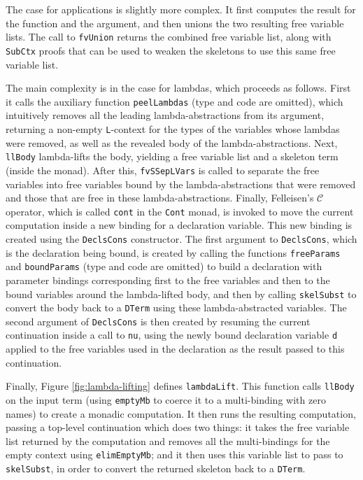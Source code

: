 \documentclass[natbib]{sigplanconf}
\begin{document}
The case for applications is slightly more complex. It first computes
the result for the function and the argument, and then unions the two
resulting free variable lists. The call to \lstinline{fvUnion} returns
the combined free variable list, along with \lstinline{SubCtx} proofs
that can be used to weaken the skeletons to use this same free
variable list.


The main complexity is in the case for lambdas, which proceeds as
follows. First it calls the auxiliary function \lstinline{peelLambdas}
(type and code are omitted), which intuitively removes all the leading
lambda-abstractions from its argument, returning a non-empty
\lstinline{L}-context for the types of the variables whose lambdas
were removed, as well as the revealed body of the lambda-abstractions.
Next, \lstinline{llBody} lambda-lifts the body, yielding a free
variable list and a skeleton term (inside the monad).  After this,
\lstinline{fvSSepLVars} is called to separate the free variables into
free variables bound by the lambda-abstractions that were removed and
those that are free in these lambda-abstractions.  Finally,
Felleisen's $\mathcal{C}$ operator, which is called \lstinline{cont}
in the \lstinline{Cont} monad, is invoked to move the current
computation inside a new binding for a declaration variable.  This new
binding is created using the \lstinline{DeclsCons} constructor.  The
first argument to \lstinline{DeclsCons}, which is the declaration
being bound, is created by calling the functions
\lstinline{freeParams} and \lstinline{boundParams} (type and code are
omitted) to build a declaration with parameter bindings corresponding
first to the free variables and then to the bound variables around the
lambda-lifted body, and then by calling \lstinline{skelSubst} to
convert the body back to a \lstinline{DTerm} using these
lambda-abstracted variables.  The second argument of
\lstinline{DeclsCons} is then created by resuming the current
continuation inside a call to \lstinline{nu}, using the newly bound
declaration variable \lstinline{d} applied to the free variables used
in the declaration as the result passed to this continuation.


Finally, Figure \ref{fig:lambda-lifting} defines
\lstinline{lambdaLift}. This function calls \lstinline{llBody} on the
input term (using \lstinline{emptyMb} to coerce it to a multi-binding
with zero names) to create a monadic computation. It then runs the
resulting computation, passing a top-level continuation which does two
things: it takes the free variable list returned by the computation
and removes all the multi-bindings for the empty context using
\lstinline{elimEmptyMb}; and it then uses this variable list to pass
to \lstinline{skelSubst}, in order to convert the returned skeleton
back to a \lstinline{DTerm}.
\end{document}

